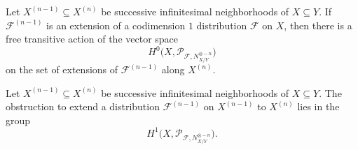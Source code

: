 \documentclass[10pt,a4paper]{amsart}
\newcommand{\F}{\mathscr{F}}
\newcommand{\PP}{\mathcal{P}}
\begin{document}
\begin{proposition} \label{extensions:dist}
Let $X^{(n-1)}\subseteq X^{(n)}$ be successive infinitesimal neighborhoods of $X\subseteq Y$. If $\F^{(n-1)}$ is an extension of a codimension $1$ distribution $\F$ on $X$, then there is a free transitive action of the vector space 
\[
H^0\big(X,\PP_{\F,N_{X/Y}^{\otimes - n}}\big)
\]
on the set of extensions of $\F^{(n-1)}$ along $X^{(n)}$. 
\end{proposition}

\begin{proposition} \label{obst:dist}
Let $X^{(n-1)}\subseteq X^{(n)}$ be successive infinitesimal neighborhoods of $X\subseteq Y$. The obstruction to extend a distribution $\F^{(n-1)}$ on $X^{(n-1)}$ to $X^{(n)}$ lies in the group
\[
H^1\Big(X, \PP_{\F,N_{X/Y}^{\otimes - n}}\Big).
\]
\end{proposition}
\end{document}
